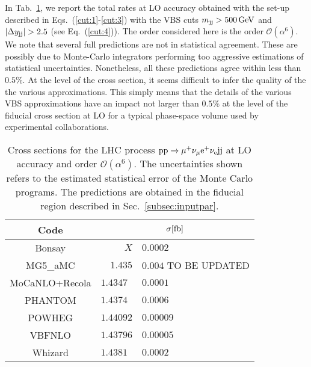 In Tab.~\ref{tab:wg1_LOrates}, we report the total rates at LO accuracy obtained with the set-up described in Eqs.~(\ref{cut:1}-\ref{cut:3}) with the VBS cuts $m_{\text{j}\text{j}} > 500 \,\text{GeV}$ and $|\Delta y_{\text{j}\text{j}}| > 2.5$ (see Eq.~(\ref{cut:4})).
The order considered here is the order $\mathcal{O}(\alpha^6)$.
We note that several full predictions are not in statistical agreement. These are possibly due to Monte-Carlo 
integrators performing too aggressive estimations of statistical uncertainties. Nonetheless, all these predictions agree within less than $0.5\%$.
At the level of the cross section, it seems difficult to infer the quality of the the various approximations.
This simply means that the details of the various VBS approximations have an impact not larger than $0.5\%$ at 
the level of the fiducial cross section at LO for a typical phase-space volume used by experimental collaborations.

\begin{table}[h!]
    \centering
    \begin{tabular}{c|r@{ $\pm$ }l}
      Code  &  \multicolumn{2}{c}{$\sigma[\rm{fb}]$}  \\
        \hline
        \hline
        {\sc Bonsay}  &  $X$ & $0.0002$ \\
        {\sc MG5\_aMC}&  $1.435$ & $0.004$ TO BE UPDATED  \\
        {\sc MoCaNLO+Recola}  &  $1.4347\phantom{0}$ & $0.0001$ \\
        {\sc PHANTOM} &  $1.4374\phantom{0}$ & $0.0006 $  \\
        {\sc POWHEG}  &  $1.44092$ & $0.00009$ \\
        {\sc VBFNLO}  &  $1.43796$ & $0.00005$ \\
        {\sc Whizard} &  $1.4381\phantom{0}$ & $0.0002 $
    \end{tabular}
    \caption{\label{tab:wg1_LOrates} Cross sections for the LHC process ${\rm p}{\rm p}\to\mu^+\nu_\mu{\rm e}^+\nu_{\rm e}{\rm j}{\rm j}$ at LO accuracy and order $\mathcal{O}(\alpha^6)$.
    The uncertainties shown refers to the estimated statistical error of the Monte Carlo programs.
    The predictions are obtained in the fiducial region described in Sec.~\ref{subsec:inputpar}.
    }
\end{table}
